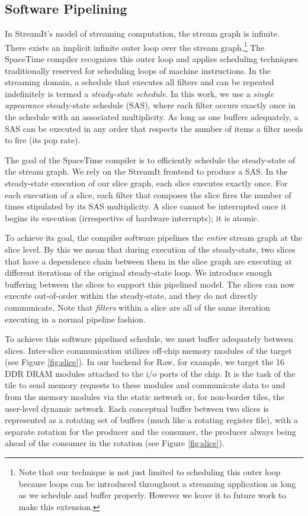 \subsection{Software Pipelining}
\label{sec:softpipe}
In StreamIt's model of streaming computation, the stream graph is
infinite.  There exists an implicit infinite outer loop over the
stream graph.\footnote{Note that our technique is not just limited to
scheduling this outer loop because loops can be introduced throughout
a streaming application as long as we schedule and buffer properly.
However we leave it to future work to make this extension.}  The
SpaceTime compiler recognizes this outer loop and applies scheduling
techniques traditionally reserved for scheduling loops of machine
instructions.  In the streaming domain, a schedule that executes all
filters and can be repeated indefinitely is termed a {\it steady-state
schedule}.  In this work, we use a {\it single appearance}
steady-state schedule (SAS), where each filter occurs exactly once in
the schedule with an associated multiplicity.  As long as one buffers
adequately, a SAS can be executed in any order that respects the
number of items a filter needs to fire (its pop rate).

The goal of the SpaceTime compiler is to efficiently schedule the
steady-state of the stream graph.  We rely on the StreamIt frontend to
produce a SAS.  In the steady-state execution of our slice graph, each
slice executes exactly once. For each execution of a slice, each
filter that composes the slice fires the number of times stipulated by
its SAS multiplicity.  A slice cannot be interrupted once it begins
its execution (irrespective of hardware interrupts); it is atomic.

To achieve its goal, the compiler software pipelines the {\it entire}
stream graph at the slice level. By this we mean that during execution
of the steady-state, two slices that have a dependence chain between
them in the slice graph are executing at different iterations of the
original steady-state loop.  We introduce enough buffering between the
slices to support this pipelined model. The slices can now execute
out-of-order within the steady-state, and they do not directly
communicate.  Note that {\it filters} within a slice are all of the
same iteration executing in a normal pipeline fashion.

To achieve this software pipelined schedule, we must buffer adequately
between slices.  Inter-slice communication utilizes off-chip memory
modules of the target (see Figure \ref{fig:slice}).  In our backend
for Raw, for example, we target the 16 DDR DRAM modules attached to
the i/o ports of the chip.  It is the task of the tile to send memory
requests to these modules and communicate data to and from the memory
modules via the static network or, for non-border tiles, the
user-level dynamic network.  Each conceptual buffer between two slices
is represented as a rotating set of buffers (much like a rotating
register file), with a separate rotation for the producer and the
consumer, the producer always being ahead of the consumer in the
rotation (see Figure \ref{fig:slice}).


